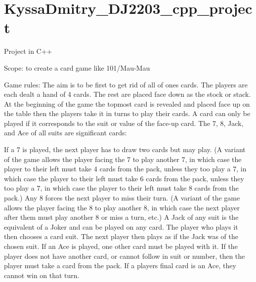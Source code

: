 \chapter{Kyssa\+Dmitry\+\_\+\+DJ2203\+\_\+cpp\+\_\+project}
\hypertarget{md__r_e_a_d_m_e}{}\label{md__r_e_a_d_m_e}
\label{md__r_e_a_d_m_e_autotoc_md0}%
%
 Project in C++

Scope\+: to create a card game like 101/\+Mau-\/\+Mau

Game rules\+: The aim is to be first to get rid of all of one\textquotesingle{}s cards. The players are each dealt a hand of 4 cards. The rest are placed face down as the stock or stack. At the beginning of the game the topmost card is revealed and placed face up on the table then the players take it in turns to play their cards. A card can only be played if it corresponds to the suit or value of the face-\/up card. The 7, 8, Jack, and Ace of all suits are significant cards\+:

If a 7 is played, the next player has to draw two cards but may play. (A variant of the game allows the player facing the 7 to play another 7, in which case the player to their left must take 4 cards from the pack, unless they too play a 7, in which case the player to their left must take 6 cards from the pack, unless they too play a 7, in which case the player to their left must take 8 cards from the pack.) Any 8 forces the next player to miss their turn. (A variant of the game allows the player facing the 8 to play another 8, in which case the next player after them must play another 8 or miss a turn, etc.) A Jack of any suit is the equivalent of a Joker and can be played on any card. The player who plays it then chooses a card suit. The next player then plays as if the Jack was of the chosen suit. If an Ace is played, one other card must be played with it. If the player does not have another card, or cannot follow in suit or number, then the player must take a card from the pack. If a player\textquotesingle{}s final card is an Ace, they cannot win on that turn. 